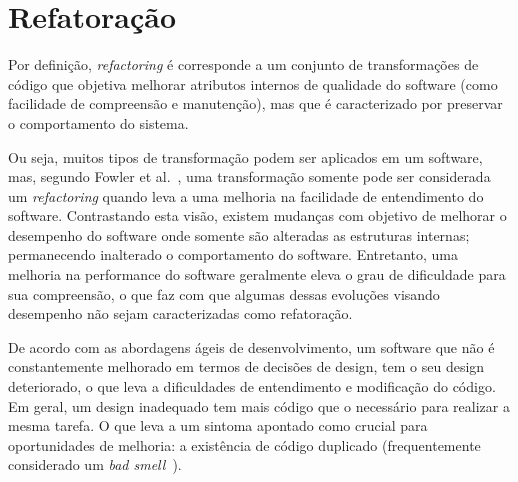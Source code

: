 \section{Refatoração}\label{sec:refactoring}

Por definição, \textit{refactoring} é corresponde a 
um conjunto de transformações  
de código que objetiva melhorar atributos internos de qualidade  
do software (como facilidade de compreensão e 
manutenção), mas que é caracterizado por preservar o comportamento do 
sistema. 

Ou seja, muitos tipos de transformação 
podem ser aplicados em um software, mas, segundo Fowler et al.~\cite{martinFowlerRafactoring}, 
uma transformação somente pode ser considerada um \textit{refactoring} quando 
leva a uma melhoria na facilidade de entendimento do software. 
Contrastando esta visão, existem mudanças com objetivo de melhorar o desempenho do 
software onde somente são alteradas as estruturas internas; permanecendo inalterado o comportamento do software. 
Entretanto, uma melhoria na performance do software geralmente eleva o grau de dificuldade para sua 
compreensão, o que faz com que algumas dessas evoluções visando desempenho não sejam 
caracterizadas como refatoração.


De acordo com as abordagens ágeis de 
desenvolvimento, um software que não é constantemente melhorado em 
termos de decisões de design, tem o seu design deteriorado, 
o que leva a dificuldades de entendimento e modificação do código. 
Em geral, um design inadequado tem mais código 
que o necessário para realizar a mesma tarefa. O que leva a um sintoma apontado 
como crucial para oportunidades de melhoria: 
a existência de código duplicado (frequentemente considerado um 
\emph{bad smell}~\cite{Tufano:2015:WYC:2818754.2818805,martinFowlerRafactoring}). 

